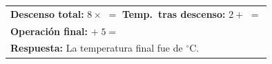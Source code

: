 \documentclass[12pt, letterpaper]{article}
\newcommand{\boxfill}[1][1.5cm]{\tcbox[on line, size=minimal, colframe=valdark!60, colback=boxbg, boxrule=0.8pt, arc=1mm, boxsep=3pt, left=2pt, right=2pt, top=2pt, bottom=2pt]{\makebox[#1]{\vphantom{M}}}}
\begin{document}
	\vspace{0.7cm}
	\begin{center}
		\begin{tabular}{l}
			\textbf{Descenso total:} $8 \times$ \boxfill[1.5cm] $=$ \boxfill[2cm] \quad
			\textbf{Temp.\ tras descenso:} $2 + $ \boxfill[2cm] $=$ \boxfill[2cm] \\[0.8cm]
			\textbf{Operación final:} \boxfill[5cm] $+\; 5 =$ \boxfill[2cm] \\[0.8cm]
			\textbf{Respuesta:} La temperatura final fue de \boxfill[2cm] $^\circ$C.
		\end{tabular}
	\end{center}
	
\end{document}
